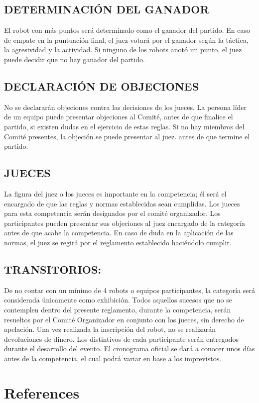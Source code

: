 \documentclass[
  letterpaper,
  DIV=11,
  numbers=noendperiod]{scrreprt}
\begin{document}
\section{DETERMINACIÓN DEL GANADOR}\label{determinaciuxf3n-del-ganador}

El robot con más puntos será determinado como el ganador del partido. En
caso de empate en la puntuación final, el juez votará por el ganador
según la táctica, la agresividad y la actividad. Si ninguno de los
robots anotó un punto, el juez puede decidir que no hay ganador del
partido.

\section{DECLARACIÓN DE OBJECIONES}\label{declaraciuxf3n-de-objeciones}

No se declararán objeciones contra las decisiones de los jueces. La
persona líder de un equipo puede presentar objeciones al Comité, antes
de que finalice el partido, si existen dudas en el ejercicio de estas
reglas. Si no hay miembros del Comité presentes, la objeción se puede
presentar al juez. antes de que termine el partido.

\section{JUECES}\label{jueces-1}

La figura del juez o los jueces es importante en la competencia; él será
el encargado de que las reglas y normas establecidas sean cumplidas. Los
jueces para esta competencia serán designados por el comité organizador.
Los participantes pueden presentar sus objeciones al juez encargado de
la categoría antes de que acabe la competencia. En caso de duda en la
aplicación de las normas, el juez se regirá por el reglamento
establecido haciéndolo cumplir.

\section{TRANSITORIOS:}\label{transitorios-1}

De no contar con un mínimo de 4 robots o equipos participantes, la
categoría será considerada únicamente como exhibición. Todos aquellos
sucesos que no se contemplen dentro del presente reglamento, durante la
competencia, serán resueltos por el Comité Organizador en conjunto con
los jueces, sin derecho de apelación. Una vez realizada la inscripción
del robot, no se realizarán devoluciones de dinero. Los distintivos de
cada participante serán entregados durante el desarrollo del evento. El
cronograma oficial se dará a conocer unos días antes de la competencia,
el cual podrá variar en base a los imprevistos.


\chapter*{References}\label{references}


\label{refs}
\end{document}
